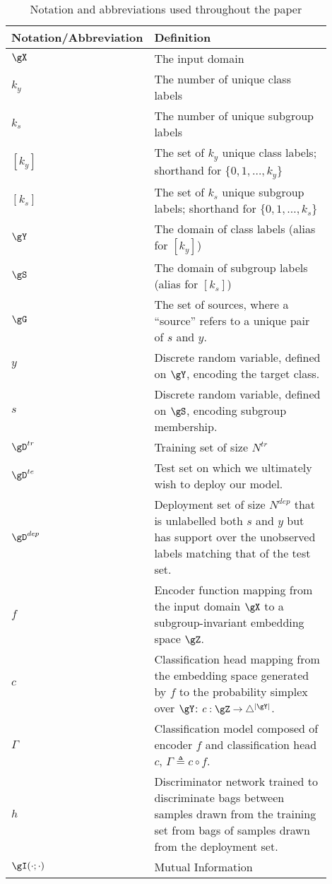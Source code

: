 \begin{table}[ht]
\caption{Notation and abbreviations used throughout the paper}
\label{notation}
\centering
\begin{tabular}{p{0.2\linewidth} | p{0.7\linewidth}}
\toprule
%
Notation/Abbreviation   & Definition \\ \midrule
%
$\gX$ & The input domain \\
$k_y$ & The number of unique class labels \\
$k_s$ & The number of unique subgroup labels \\
$[ k_y ]$ & The set of $k_y$ unique class labels; shorthand for $\{ 0, 1, \dots, k_y \}$ \\
$[ k_s ]$ & The set of $k_s$ unique subgroup labels; shorthand for $\{ 0, 1, \dots, k_s \}$ \\
$\gY$ & The domain of class labels (alias for $[ k_y ]$) \\
$\gS$ & The domain of subgroup labels (alias for $[ k_s ]$) \\
$\gG$ & The set of sources, where a ``source'' refers to a unique pair of $s$ and $y$. \\
$y$ & Discrete random variable, defined on $\gY$, encoding the target class. \\
$s$ & Discrete random variable, defined on $\gS$, encoding subgroup membership. \\
$\gD^{tr}$ & Training set of size $N^{tr}$ \\
$\gD^{te}$ & Test set on which we ultimately wish to deploy our model. \\
$\gD^{dep}$ & Deployment set of size $N^{dep}$ that is unlabelled \wrt{} both $s$ and $y$
but has support over the unobserved labels matching that of the test set. \\
$f$ & Encoder function mapping from the input domain $\gX$ to a subgroup-invariant embedding space
$\gZ$. \\
$c$ & Classification head mapping from the embedding space generated by $f$ to the probability
simplex over $\gY$: $c: \gZ \to \bigtriangleup^{|\gY|}$. \\
$\Gamma$ & Classification model composed of encoder $f$ and classification head $c$, $\Gamma
\triangleq c \circ
f$. \\
$h$ & Discriminator network trained to discriminate bags between samples drawn from the training set from
bags of samples drawn from the deployment set. \\
$ \gI(\cdot; \cdot)$ & Mutual Information \\

\end{tabular}
\end{table}
